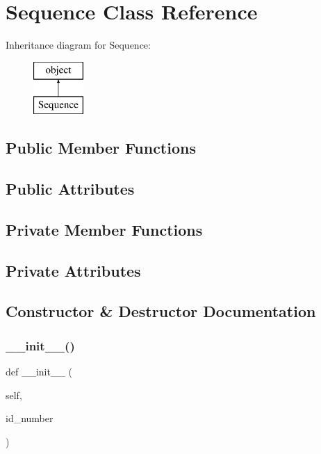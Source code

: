 \hypertarget{classopenbu_1_1sequence_1_1_sequence}{}\section{Sequence Class Reference}
\label{classopenbu_1_1sequence_1_1_sequence}
Inheritance diagram for Sequence\+:\begin{figure}[H]
\begin{center}
\leavevmode
\includegraphics[height=2.000000cm]{classopenbu_1_1sequence_1_1_sequence}
\end{center}
\end{figure}
\subsection*{Public Member Functions}
\subsection*{Public Attributes}
\subsection*{Private Member Functions}
\subsection*{Private Attributes}


\subsection{Constructor \& Destructor Documentation}
\mbox{\label{classopenbu_1_1sequence_1_1_sequence_ae4664a4675345d114311cbd0ac402a0a}} 
\subsubsection{\texorpdfstring{\+\_\+\+\_\+init\+\_\+\+\_\+()}{\_\_init\_\_()}}
{\footnotesize\ttfamily def \+\_\+\+\_\+init\+\_\+\+\_\+ (\begin{DoxyParamCaption}\item[{}]{self,  }\item[{}]{id\+\_\+number }\end{DoxyParamCaption})}



